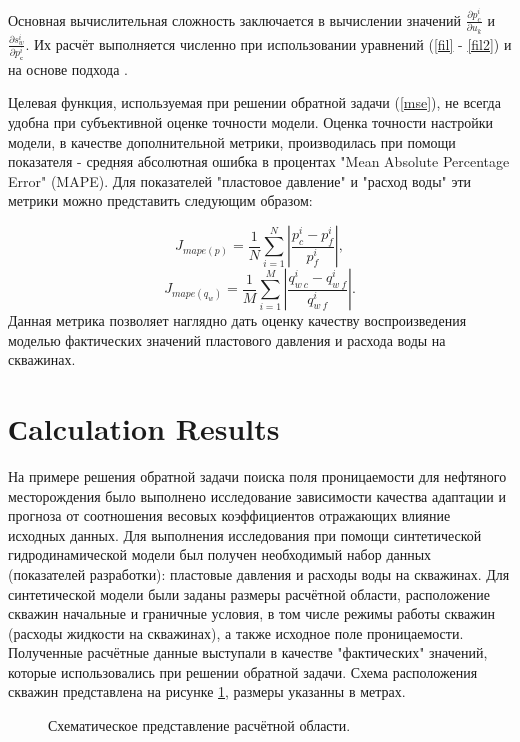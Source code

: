 \documentclass{article}
\begin{document}
Основная вычислительная сложность заключается в вычислении значений $\frac{\partial p_c^i}{\partial u_k}$ и $\frac{\partial s_w^i}{\partial p_с^i}$. Их расчёт выполняется численно при использовании уравнений (\ref{fil} - \ref{fil2}) и на основе подхода \cite{opt}.

Целевая функция, используемая при решении обратной задачи ({\ref{mse}}), не всегда удобна при субъективной оценке точности модели. Оценка точности настройки модели, в качестве дополнительной метрики, производилась при помощи показателя - средняя абсолютная ошибка в процентах "Mean Absolute Percentage Error" (MAPE). Для показателей "пластовое давление" и  "расход воды" эти метрики можно представить следующим образом:

\begin{equation} \label{mape_p}
 	J_{mape(p)}=\frac{1}{N}\sum_{i=1}^N{\left|\frac{p_c^i-p_f^i}{p_f^i}\right|},
\end{equation}
\begin{equation} \label{mape_qo}
 	J_{mape(q_w)}=\frac{1}{M}\sum_{i=1}^M{\left|\frac{q_{w\:c}^i-q_{w\:f}^i}{q_{w\:f}^i}\right|}.
\end{equation}
Данная метрика позволяет наглядно дать оценку качеству воспроизведения моделью фактических значений пластового давления и расхода воды на скважинах.
\section{Сalculation Results}
На примере решения обратной задачи поиска поля проницаемости для нефтяного месторождения было выполнено исследование зависимости качества адаптации и прогноза от соотношения весовых коэффициентов отражающих влияние исходных данных. Для выполнения исследования при помощи синтетической гидродинамической модели был получен необходимый набор данных (показателей разработки): пластовые давления и расходы воды на скважинах. Для синтетической модели были заданы размеры расчётной области, расположение скважин начальные и граничные условия, в том числе режимы работы скважин (расходы жидкости на скважинах), а также исходное поле проницаемости. Полученные расчётные данные выступали в качестве "фактических" значений, которые использовались при решении обратной задачи. Схема расположения скважин представлена на рисунке \ref{fig:map}, размеры указанны в метрах. 
\begin{figure}
    \caption{Схематическое представление расчётной области.}
	\label{fig:map}
\end{figure}
\end{document}
